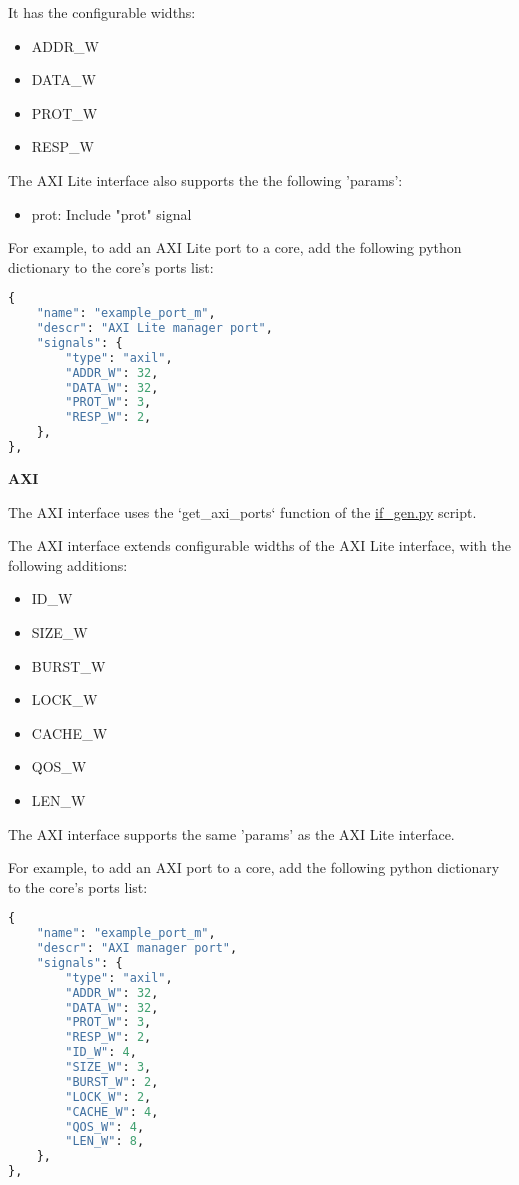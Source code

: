 
It has the configurable widths: 
\begin{itemize}
  \item ADDR\_W
  \item DATA\_W
  \item PROT\_W
  \item RESP\_W
\end{itemize}

The AXI Lite interface also supports the the following 'params':
\begin{itemize}
  \item prot: Include "prot" signal
\end{itemize}

For example, to add an AXI Lite port to a core, add the following python dictionary to the core's ports list:
\begin{lstlisting}[language=python]
{
	"name": "example_port_m",
	"descr": "AXI Lite manager port",
	"signals": {
		"type": "axil",
		"ADDR_W": 32,
		"DATA_W": 32,
		"PROT_W": 3,
		"RESP_W": 2,
	},
},
\end{lstlisting}


%
%
\clearpage
\large\textbf{AXI}

The AXI interface uses the `get\_axi\_ports` function of the \href{https://github.com/IObundle/py2hwsw/blob/main/py2hwsw/scripts/if_gen.py}{if\_gen.py} script.


The AXI interface extends configurable widths of the AXI Lite interface, with the following additions:
\begin{itemize}
  \item ID\_W
  \item SIZE\_W
  \item BURST\_W
  \item LOCK\_W
  \item CACHE\_W
  \item QOS\_W
  \item LEN\_W
\end{itemize}

The AXI interface supports the same 'params' as the AXI Lite interface.

For example, to add an AXI port to a core, add the following python dictionary to the core's ports list:
\begin{lstlisting}[language=python]
{
	"name": "example_port_m",
	"descr": "AXI manager port",
	"signals": {
		"type": "axil",
		"ADDR_W": 32,
		"DATA_W": 32,
		"PROT_W": 3,
		"RESP_W": 2,
		"ID_W": 4,
		"SIZE_W": 3,
		"BURST_W": 2,
		"LOCK_W": 2,
		"CACHE_W": 4,
		"QOS_W": 4,
		"LEN_W": 8,
	},
},
\end{lstlisting}


